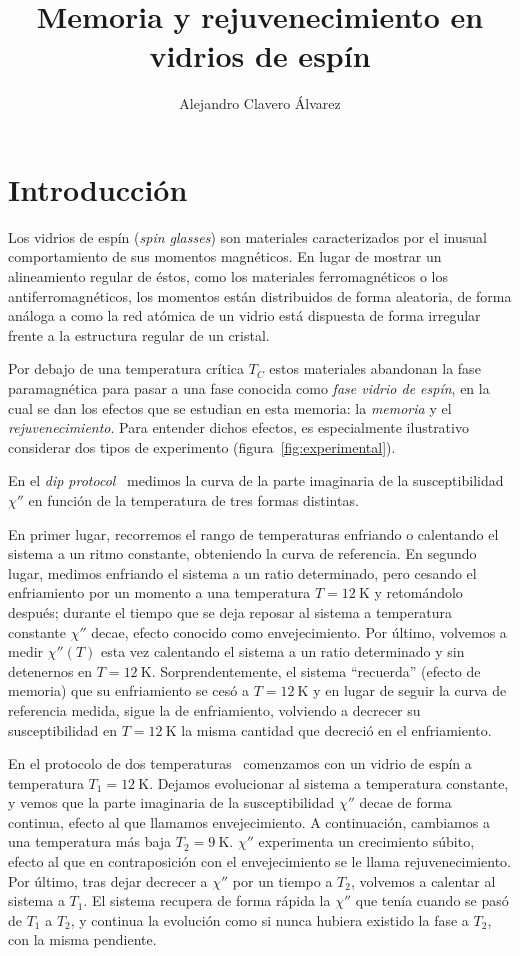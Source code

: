 \documentclass[11pt]{report}
\title{Memoria y rejuvenecimiento en vidrios de espín}
\author{Alejandro Clavero Álvarez}
\newcommand{\sub}[1]{ _{{\scriptscriptstyle \mathit{#1}}}  }
\begin{document}





\tableofcontents


\chapter{Introducción}

Los vidrios de espín (\textit{spin glasses}) son materiales
caracterizados por el inusual comportamiento de sus momentos
magnéticos. En lugar de mostrar un alineamiento regular de éstos, como
los materiales ferromagnéticos o los antiferromagnéticos, los momentos
están distribuidos de forma aleatoria, de forma análoga a como la red
atómica de un vidrio está dispuesta de forma irregular frente a la
estructura regular de un cristal.

Por debajo de una temperatura crítica $T\sub{C}$ estos
materiales abandonan la fase paramagnética para pasar a una fase
conocida como \emph{fase vidrio de espín}, en la cual se dan los
efectos que se estudian en esta memoria: la \emph{memoria} y el
\emph{rejuvenecimiento}. Para entender dichos efectos, es
especialmente ilustrativo considerar dos tipos de experimento
(figura~\ref{fig:experimental}).

En el \textit{dip protocol}~\cite{dippaper} medimos la curva de la
parte imaginaria de la susceptibilidad $χ''$ en función de la
temperatura de tres formas distintas.

En primer lugar, recorremos el rango de temperaturas enfriando o
calentando el sistema a un ritmo constante, obteniendo la curva de
referencia. En segundo lugar, medimos enfriando el sistema a un ratio
determinado, pero cesando el enfriamiento por un momento a una
temperatura $T=\SI{12}{\K}$ y retomándolo después; durante el tiempo
que se deja reposar al sistema a temperatura constante $χ''$ decae,
efecto conocido como envejecimiento. Por último, volvemos a medir
$χ''(T)$ esta vez calentando el sistema a un ratio determinado y sin
detenernos en $T=\SI{12}{\K}$. Sorprendentemente, el sistema
``recuerda'' (efecto de memoria) que su enfriamiento se cesó a
$T=\SI{12}{\K}$ y en lugar de seguir la curva de referencia medida, sigue
la de enfriamiento, volviendo a decrecer su susceptibilidad en
$T=\SI{12}{\K}$ la misma cantidad que decreció en el enfriamiento.

En el protocolo de dos temperaturas~\cite{threeprotocolpaper}
comenzamos con un vidrio de espín a temperatura $T_1=\SI{12}{\K}$.
Dejamos evolucionar al sistema a temperatura constante, y vemos que la
parte imaginaria de la susceptibilidad $χ''$ decae de forma continua,
efecto al que llamamos envejecimiento. A continuación, cambiamos a una
temperatura más baja $T_2=\SI{9}{\K}$. $χ''$ experimenta un
crecimiento súbito, efecto al que en contraposición con el
envejecimiento se le llama rejuvenecimiento. Por último, tras dejar
decrecer a $χ''$ por un tiempo a $T_2$, volvemos a calentar al sistema
a $T_1$. El sistema recupera de forma rápida la $χ''$ que tenía cuando
se pasó de $T_1$ a $T_2$, y continua la evolución como si nunca
hubiera existido la fase a $T_2$, con la misma pendiente.
\end{document}
